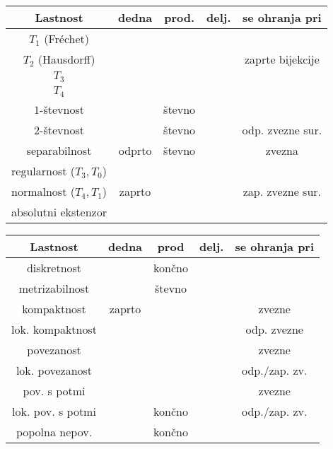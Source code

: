 \documentclass[10pt,a4paper]{article}
\newcommand{\cmark}{\checkmark}%
\newcommand{\xmark}{\ding{55}}%
\begin{document}
\vspace{-4mm}
\begin{table}[htbp]
    \begin{tabular}{|c|c|c|c|c|}\hline
        Lastnost                & dedna & prod. & delj. & se ohranja pri    \\ \hline
        $T_1$ (Fréchet)         & \cmark& \cmark& \xmark&                   \\ \hline
        $T_2$ (Hausdorff)       & \cmark& \cmark& \xmark& zaprte bijekcije  \\ \hline
        $T_3$                   & \cmark& \cmark& \xmark&                   \\ \hline
        $T_4$                   &       &   	& \xmark&                   \\ \hline
        $1$-števnost            & \cmark& števno& \xmark&                   \\ \hline
        $2$-števnost            & \cmark& števno& \xmark& odp. zvezne sur.  \\ \hline
        separabilnost           & odprto& števno& \cmark& zvezna            \\ \hline
        regularnost ($T_3, T_0$)& \cmark& \cmark&       &                   \\ \hline
        normalnost ($T_4, T_1$) & zaprto&       &       & zap. zvezne sur.  \\ \hline
        absolutni ekstenzor     &       & \cmark&       &                   \\ \hline
    \end{tabular}
    \begin{tabular}{|c|c|c|c|c|} \hline
        Lastnost          & dedna & prod  & delj. & se ohranja pri\\ \hline
        diskretnost       & \cmark& končno& \cmark&               \\ \hline
        metrizabilnost    & \cmark& števno& \xmark&               \\ \hline
        kompaktnost       & zaprto& \cmark& \cmark& zvezne        \\ \hline
        lok. kompaktnost  &       & \cmark& \xmark& odp. zvezne   \\ \hline
        povezanost        &       & \cmark& \cmark& zvezne        \\ \hline
        lok. povezanost   &       & \cmark& \cmark& odp./zap. zv.\\ \hline
        pov. s potmi      &       & \cmark& \cmark& zvezne        \\ \hline
        lok. pov. s potmi &       & končno& \cmark& odp./zap. zv. \\ \hline
        popolna nepov.    &       & končno& \xmark&               \\ \hline
    \end{tabular}
\end{table}
\vspace{-4mm}
\end{document}
